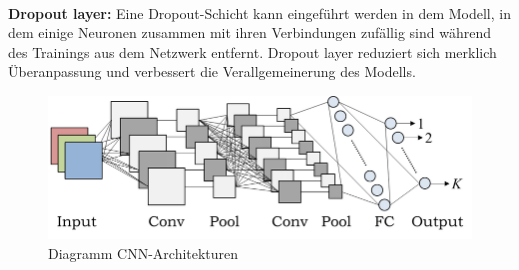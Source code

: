 \documentclass[a4paper,11pt]{article}
\theoremstyle{mytheor}
\begin{document}
\\ \textbf{Dropout layer: }Eine Dropout-Schicht kann eingeführt werden
in dem Modell, in dem einige Neuronen zusammen mit ihren Verbindungen zufällig sind während des Trainings aus dem Netzwerk entfernt. Dropout layer reduziert sich merklich Überanpassung und verbessert die Verallgemeinerung des Modells.
\begin{figure}
	\includegraphics[width=1\textwidth]{An-example-of-CNN-architecture.png}
	\caption [Diagramm CNN-Architekturen] {Diagramm CNN-Architekturen \footnotemark}
	\end{figure}
\end{document}
